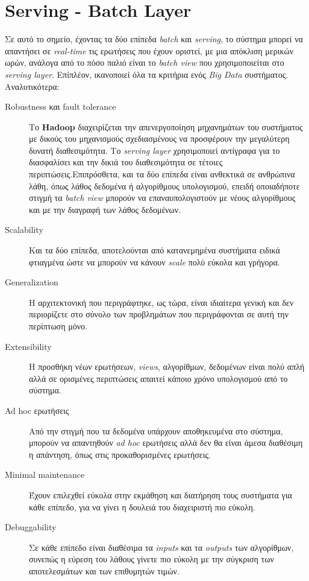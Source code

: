 \section{Serving - Batch Layer}
Σε αυτό το σημείο, έχοντας τα δύο επίπεδα \textit{batch} και \textit{serving}, το σύστημα μπορεί να απαντήσει σε \textit{real-time} τις ερωτήσεις που έχουν οριστεί, με μια απόκλιση μερικών ωρών, ανάλογα από το πόσο παλιό είναι το \textit{batch view} που χρησιμοποιείται στο \textit{serving layer}. Επίπλέον, ικανοποιεί όλα τα κριτήρια ενός \textit{Big Data} συστήματος. Αναλυτικότερα:
\begin{description}
\item[Robustness και fault tolerance] Το \textbf{Hadoop} διαχειρίζεται την απενεργοποίηση μηχανημάτων του συστήματος με δικούς του μηχανισμούς σχεδιασμένους να προσφέρουν την μεγαλύτερη δυνατή διαθεσιμότητα. Το \textit{serving layer} χρησιμοποιεί αντίγραφα για το διασφαλίσει και την δικιά του διαθεσιμότητα σε τέτοιες περιπτώσεις.Επιπρόσθετα, και τα δύο επίπεδα είναι ανθεκτικά σε ανθρώπινα λάθη, όπως λάθος δεδομένα ή αλγορίθμους υπολογισμού, επειδή οποιαδήποτε στιγμή τα \textit{batch view} μπορούν να επαναυπολογιστούν με νέους αλγορίθμους και με την διαγραφή των λάθος δεδομένων.
\item [Scalability] Και τα δύο επίπεδα, αποτελούνται από κατανεμημένα συστήματα ειδικά φτιαγμένα ώστε να μπορούν να κάνουν \textit{scale} πολύ εύκολα και γρήγορα.
\item[Generalization] Η αρχιτεκτονική που περιγράφτηκε, ως τώρα, είναι ιδιαίτερα γενική και δεν περιορίζετε στο σύνολο των προβλημάτων που περιγράφονται σε αυτή την περίπτωση μόνο.
\item [Extensibility] Η προσθήκη νέων ερωτήσεων, \textit{views}, αλγορίθμων, δεδομένων είναι πολύ απλή αλλά σε ορισμένες περιπτώσεις απαιτεί κάποιο χρόνο υπολογισμού από το σύστημα.
\item [Ad hoc ερωτήσεις] Από την στιγμή που τα δεδομένα υπάρχουν αποθηκευμένα στο σύστημα, μπορούν να απαντηθούν \textit{ad hoc} ερωτήσεις αλλά δεν θα είναι άμεσα διαθέσιμη η απάντηση, όπως στις προκαθορισμένες ερωτήσεις.
\item [Minimal maintenance] Έχουν επιλεχθεί εύκολα στην εκμάθηση και διατήρηση τους συστήματα για κάθε επίπεδο, για να γίνει η δουλειά του διαχειριστή πιο εύκολη.
\item [Debuggability] Σε κάθε επίπεδο είναι διαθέσιμα τα \textit{inputs} και τα \textit{outputs} των αλγορίθμων, συνεπώς η εύρεση του λάθους γίνετε πιο εύκολη με την σύγκριση των αποτελεσμάτων και των επιθυμητών τιμών.
\end{description}
